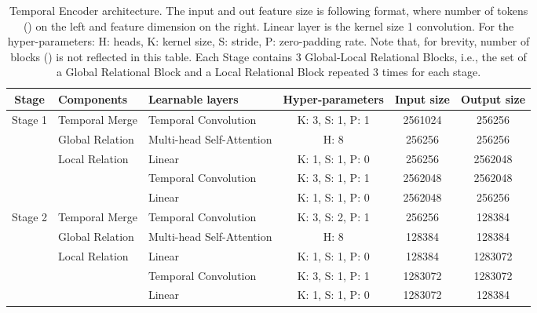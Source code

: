 \documentclass[10pt,twocolumn,letterpaper]{article}
\begin{document}
\begin{table*}[h!] 
\caption{Temporal Encoder architecture. The input and out feature size is following  format, where number of tokens () on the left and feature dimension  on the right. Linear layer is the kernel size 1 convolution. For the hyper-parameters: H: heads, K: kernel size, S: stride, P: zero-padding rate. Note that, for brevity, number of blocks () is not reflected in this table. Each Stage contains 3 Global-Local Relational Blocks, i.e., the set of a Global Relational Block and a Local Relational Block repeated 3 times for each stage. }
\label{tab:architecture}
\begin{tabular}{c|l|l|c|c|c}
\hline
Stage                                         & Components                      & Learnable layers     & Hyper-parameters             & Input size         & Output size        \\ \hline
\multicolumn{1}{c|}{\multirow{5}{*}{Stage 1}} & Temporal Merge                      & Temporal Convolution           & K: 3, S: 1, P: 1 & 2561024 & 256256  \\ \cline{2-6} 
\multicolumn{1}{c|}{}                         & Global Relation                 & Multi-head Self-Attention & H: 8             & 256256  & 256256  \\ \cline{2-6} 
\multicolumn{1}{c|}{}                         & \multirow{3}{*}{Local Relation} & Linear               & K: 1, S: 1, P: 0 & 256256  & 2562048 \\ \multicolumn{1}{c|}{}                         &                                 & Temporal Convolution           & K: 3, S: 1, P: 1 & 2562048 & 2562048 \\ \multicolumn{1}{c|}{}                         &                                 & Linear               & K: 1, S: 1, P: 0 & 2562048 & 256256  \\ \hline
\multirow{5}{*}{Stage 2}                      & Temporal Merge                      & Temporal Convolution           & K: 3, S: 2, P: 1 & 256256  & 128384  \\ \cline{2-6} 
                                              & Global Relation                 & Multi-head Self-Attention & H: 8             & 128384  & 128384  \\ \cline{2-6} 
                                              & \multirow{3}{*}{Local Relation} & Linear               & K: 1, S: 1, P: 0 & 128384  & 1283072 \\ &                                 & Temporal Convolution           & K: 3, S: 1, P: 1 & 1283072 & 1283072 \\ &                                 & Linear               & K: 1, S: 1, P: 0 & 1283072 & 128384  \\ \hline

\end{tabular}
\end{table*}
\end{document}

